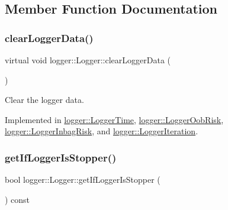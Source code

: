 \subsection{Member Function Documentation}
\mbox{\label{classlogger_1_1_logger_a8c68db2430fa84b67528bfa6ae45a516}} 
\subsubsection{\texorpdfstring{clear\+Logger\+Data()}{clearLoggerData()}}
{\footnotesize\ttfamily virtual void logger\+::\+Logger\+::clear\+Logger\+Data (\begin{DoxyParamCaption}{ }\end{DoxyParamCaption})\hspace{0.3cm}{\ttfamily [pure virtual]}}



Clear the logger data. 



Implemented in \hyperlink{classlogger_1_1_logger_time_a0bcce74556cf50de86b8d7333d82e919}{logger\+::\+Logger\+Time}, \hyperlink{classlogger_1_1_logger_oob_risk_a8330dd8fd748c8ea1e0027f1b2c7ea50}{logger\+::\+Logger\+Oob\+Risk}, \hyperlink{classlogger_1_1_logger_inbag_risk_ad5428486e370ae88e3bcb3a6c18d0f44}{logger\+::\+Logger\+Inbag\+Risk}, and \hyperlink{classlogger_1_1_logger_iteration_ac7c2aace3ba5f22d8f42ec078fe62602}{logger\+::\+Logger\+Iteration}.

\mbox{\label{classlogger_1_1_logger_ae39cfa15ba833840ae52889c09cac994}} 
\subsubsection{\texorpdfstring{get\+If\+Logger\+Is\+Stopper()}{getIfLoggerIsStopper()}}
{\footnotesize\ttfamily bool logger\+::\+Logger\+::get\+If\+Logger\+Is\+Stopper (\begin{DoxyParamCaption}{ }\end{DoxyParamCaption}) const}



